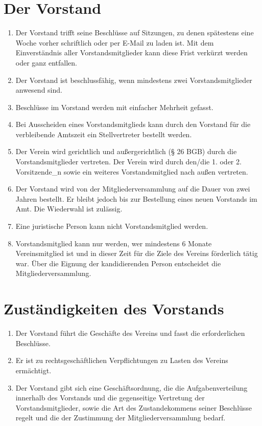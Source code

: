 \documentclass[a4paper, 12pt]{scrartcl}
\begin{document}
\section{Der Vorstand}
\label{der-vorstand}
\begin{enumerate}
\item Der Vorstand trifft seine Beschlüsse auf Sitzungen, zu denen spätestens eine Woche vorher schriftlich oder per E-Mail zu laden ist. Mit dem Einverständnis aller Vorstandsmitglieder kann diese Frist verkürzt werden oder ganz entfallen.
	\item Der Vorstand ist beschlussfähig, wenn mindestens zwei Vorstandsmitglieder anwesend sind.
	\item Beschlüsse im Vorstand werden mit einfacher Mehrheit gefasst.
	\item Bei Ausscheiden eines Vorstandsmitglieds kann durch den Vorstand für die verbleibende Amtszeit ein Stellvertreter bestellt werden.
	\item \label{der-vorstand-vertretung} Der Verein wird gerichtlich und außergerichtlich (§ 26 BGB) durch die Vorstandsmitglieder vertreten. Der Verein wird durch den/die 1. oder 2. Vorsitzende\_n sowie ein weiteres Vorstandsmitglied nach außen vertreten.
	\item \label{der-vorstand-amtszeit} Der Vorstand wird von der Mitgliederversammlung auf die Dauer von zwei Jahren bestellt. Er bleibt jedoch bis zur Bestellung eines neuen Vorstands im Amt. Die Wiederwahl ist zulässig.
	\item Eine juristische Person kann nicht Vorstandsmitglied werden.
	\item \label{der-vorstand-zugehoerigkeit}Vorstandsmitglied kann nur werden, wer mindestens 6 Monate Vereinsmitglied ist und in dieser Zeit für die Ziele des Vereins förderlich
tätig war. Über die Eignung der kandidierenden Person entscheidet die Mitgliederversammlung.
\end{enumerate}

\section{Zuständigkeiten des Vorstands}
\begin{enumerate}
	\item Der Vorstand führt die Geschäfte des Vereins und fasst die erforderlichen Beschlüsse.
	\item Er ist zu rechtsgeschäftlichen Verpflichtungen zu Lasten des Vereins ermächtigt.
	\item Der Vorstand gibt sich eine Geschäftsordnung, die die Aufgabenverteilung innerhalb des Vorstands und die gegenseitige Vertretung der Vorstandsmitglieder, sowie die Art des Zustandekommens seiner Beschlüsse regelt und die der Zustimmung der Mitgliederversammlung bedarf.
\end{enumerate}
\end{document}
